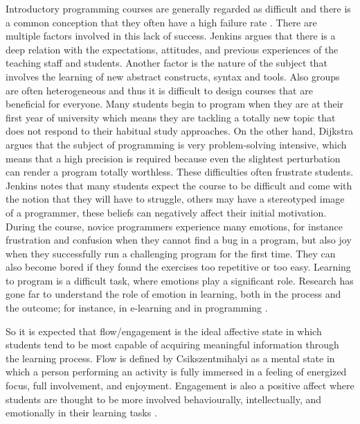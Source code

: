 \documentclass[conference]{IEEEtran}
\begin{document}
Introductory programming courses are
generally regarded as difficult \cite{robins2003learning,lahtinen2005study} 
and there is a common conception that they often have a high
failure rate \cite{bennedsen2007failure}. There are multiple factors
involved in this lack of success.
Jenkins \cite{jenkins2001motivation} argues that there is a deep  relation with the expectations,
attitudes, and previous experiences of the teaching staff and students. Another
factor is the nature of the subject that involves the learning of new abstract
constructs, syntax and tools. %
Also groups are often heterogeneous and thus it is
difficult to design courses that are beneficial for everyone. Many students
begin to program when they are at their first year of university which
means they are tackling a totally new topic that does not respond to their habitual
study approaches. %
On the other hand, Dijkstra \cite{dijkstra1989cruelty} argues that the subject of programming is very
problem-solving intensive, which means that a  high precision is required because even the
slightest perturbation can render a program totally worthless. These
difficulties often frustrate students. 
Jenkins \cite{jenkins2001motivation,jenkins2002difficulty} notes that many
students expect the course to be difficult and come with the notion that they
will have to struggle, others may have a stereotyped image of a programmer,
these beliefs can negatively affect their initial motivation. During the course,
novice programmers experience many emotions, for instance frustration and
confusion when they cannot find a bug in a program, but also joy when they
successfully run a challenging program for the first time. They can also become
bored if they found the exercises too repetitive or too easy. Learning to
program is a difficult task, where emotions play a significant role. Research
has gone far to understand the role of emotion in learning, both in the process
and the outcome; for instance, in e-learning  \cite{kort2001affective,rossin2009effects}
and in programming  \cite{rodrigo2009affective,jenkins2001motivation,
bosch2013emotions,khan2007mood}.

So it is expected that flow/engagement is the ideal affective state in which
students tend to be most capable of acquiring meaningful information through the
learning process. Flow is defined by Csikszentmihalyi \cite{csikszentmihalyi1990flow}
as a mental state in which a person performing an activity is fully immersed in a feeling of
energized focus, full involvement, and enjoyment. Engagement is also a positive
affect where students are thought to be more involved behaviourally,
intellectually, and emotionally in their learning tasks \cite{bangert2002teacher}.
\end{document}
